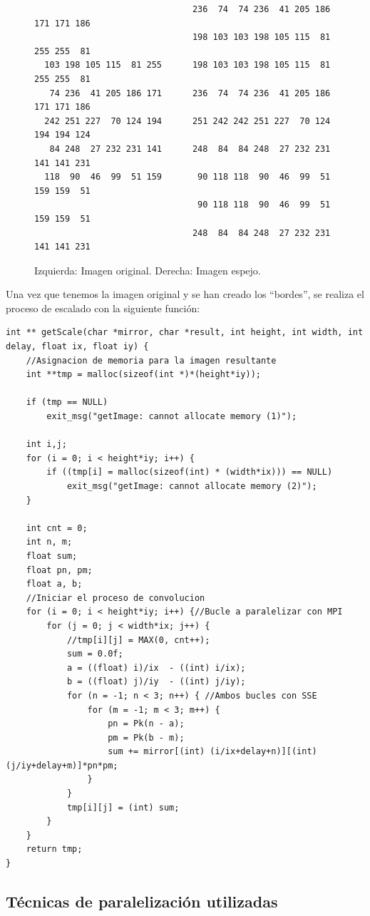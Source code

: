\documentclass{article}
\begin{document}
\begin{figure}[h]
\centering
\begin{lstlisting}
                               236  74  74 236  41 205 186 171 171 186
                               198 103 103 198 105 115  81 255 255  81 
  103 198 105 115  81 255      198 103 103 198 105 115  81 255 255  81   
   74 236  41 205 186 171      236  74  74 236  41 205 186 171 171 186
  242 251 227  70 124 194      251 242 242 251 227  70 124 194 194 124
   84 248  27 232 231 141      248  84  84 248  27 232 231 141 141 231
  118  90  46  99  51 159       90 118 118  90  46  99  51 159 159  51 
                                90 118 118  90  46  99  51 159 159  51
                               248  84  84 248  27 232 231 141 141 231	
\end{lstlisting}
\caption{Izquierda: Imagen original. Derecha: Imagen espejo.}
\label{fig:ejemploMatrices}
\end{figure}

Una vez que tenemos la imagen original y se han creado los ``bordes'', se realiza el proceso de escalado con la siguiente función:

\begin{lstlisting}[style=C]
int ** getScale(char *mirror, char *result, int height, int width, int delay, float ix, float iy) {
	//Asignacion de memoria para la imagen resultante
	int **tmp = malloc(sizeof(int *)*(height*iy));
	
	if (tmp == NULL)
		exit_msg("getImage: cannot allocate memory (1)");
	
	int i,j;
	for (i = 0; i < height*iy; i++) {
		if ((tmp[i] = malloc(sizeof(int) * (width*ix))) == NULL)
			exit_msg("getImage: cannot allocate memory (2)");
	}

	int cnt = 0;
	int n, m;
	float sum;
	float pn, pm;
	float a, b;
	//Iniciar el proceso de convolucion
	for (i = 0; i < height*iy; i++) {//Bucle a paralelizar con MPI
		for (j = 0; j < width*ix; j++) {
			//tmp[i][j] = MAX(0, cnt++);
			sum = 0.0f;
			a = ((float) i)/ix  - ((int) i/ix);
			b = ((float) j)/iy  - ((int) j/iy);
			for (n = -1; n < 3; n++) { //Ambos bucles con SSE
				for (m = -1; m < 3; m++) {
					pn = Pk(n - a);
					pm = Pk(b - m);
					sum += mirror[(int) (i/ix+delay+n)][(int) (j/iy+delay+m)]*pn*pm;
				}
			}
			tmp[i][j] = (int) sum;	
		}
	}
	return tmp;
}
\end{lstlisting}

\subsection{Técnicas de paralelización utilizadas}
\end{document}
